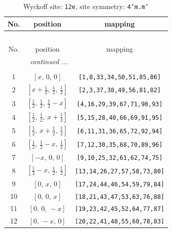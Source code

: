 \documentclass[fleqn,8pt]{jsarticle}
\begin{document}
\begin{longtable}{ccc}
\caption{Wyckoff site: {\tt 12e}, site symmetry: {\tt 4'm.m'}}
 \\
 \hline \hline
No. & position & mapping \\ \hline \endfirsthead

\multicolumn{2}{l}{\tablename\ \thetable{}} \\
 \hline \hline
No. & position & mapping \\ \hline \endhead

 \hline \hline
\multicolumn{2}{r}{\footnotesize\it continued ...} \\ \endfoot

 \hline \hline
\multicolumn{2}{r}{} \\ \endlastfoot

1 & $\left[ x,\, 0,\, 0 \right]$ & {\tt [1,8,33,34,50,51,85,86]} \\ \hline
2 & $\left[ x + \frac{1}{2},\, \frac{1}{2},\, \frac{1}{2} \right]$ & {\tt [2,3,37,38,49,56,81,82]} \\ \hline
3 & $\left[ \frac{1}{2},\, \frac{1}{2},\, \frac{1}{2} - x \right]$ & {\tt [4,16,29,39,67,71,90,93]} \\ \hline
4 & $\left[ \frac{1}{2},\, \frac{1}{2},\, x + \frac{1}{2} \right]$ & {\tt [5,15,28,40,66,69,91,95]} \\ \hline
5 & $\left[ \frac{1}{2},\, x + \frac{1}{2},\, \frac{1}{2} \right]$ & {\tt [6,11,31,36,65,72,92,94]} \\ \hline
6 & $\left[ \frac{1}{2},\, \frac{1}{2} - x,\, \frac{1}{2} \right]$ & {\tt [7,12,30,35,68,70,89,96]} \\ \hline
7 & $\left[ - x,\, 0,\, 0 \right]$ & {\tt [9,10,25,32,61,62,74,75]} \\ \hline
8 & $\left[ \frac{1}{2} - x,\, \frac{1}{2},\, \frac{1}{2} \right]$ & {\tt [13,14,26,27,57,58,73,80]} \\ \hline
9 & $\left[ 0,\, x,\, 0 \right]$ & {\tt [17,24,44,46,54,59,79,84]} \\ \hline
10 & $\left[ 0,\, 0,\, x \right]$ & {\tt [18,21,43,47,53,63,76,88]} \\ \hline
11 & $\left[ 0,\, 0,\, - x \right]$ & {\tt [19,23,42,45,52,64,77,87]} \\ \hline
12 & $\left[ 0,\, - x,\, 0 \right]$ & {\tt [20,22,41,48,55,60,78,83]} \\
\end{longtable}
\renewcommand{\arraystretch}{1.2}
\end{document}
